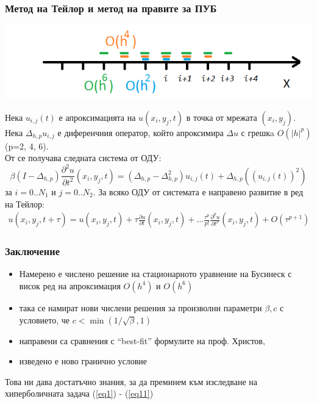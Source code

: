 \documentclass{beamer}
\newcommand{\rf}[1]{(\ref{#1})}
\begin{document}
\begin{frame}
\frametitle{Метод на Тейлор и метод на правите за ПУБ}
\begin{center}\vspace{0.25cm}
	\begin{minipage}[b]{0.45\linewidth}
		 \includegraphics[width=\linewidth]{../amitans/figures/FDS.png}
	\end{minipage}	
\end{center}
Нека $u_{i,j}(t)$ е апроксимацията на $u(x_i, y_j, t)$ в точка от мрежата $(x_i, y_j)$.
\\
Нека $\Delta_{h,p} u_{i,j}$ е диференчния оператор, който апроксимира $\Delta u$ с грешкa $O(|h|^p)$ (p=2, 4, 6).
\\
От  се получава следната система от ОДУ:
\begin{equation}\label{DiscreteEq}
\beta (I-\Delta_{h,p}) \frac{\partial^2 u}{\partial t^2}(x_i, y_j, t)=
 (\Delta_{h,p} - \Delta_{h,p}^2) u_{i, j}(t) + \Delta_{h,p} ( ( u_{i, j}(t) )^2 )
\end{equation}
за $i = 0..N_1$ и $j=0..N_2$. За всяко ОДУ от системата е направено развитие в ред на Тейлор:
\begin{align} \label{TSe}
u(x_i, y_j, t+\tau) = u(x_i, y_j, t) + \tau \frac{ \partial u }{ \partial t }(x_i, y_j, t)  + ... 
\frac{ \tau^p }{ p! } \frac{ \partial^p u }{ \partial t^p }(x_i, y_j, t) + O(\tau^{p+1})
\end{align}

\end{frame}

\begin{frame}
\frametitle{Заключение}

\begin{itemize}
  \item Намерено е числено решение на стационарното уравнение на Бусинеск с висок ред на апроксимация $O(h^4)$ и $O(h^6)$
  \item така се намират нови числени решения за произволни параметри $\beta, c$ с условието, че $c < \min (1/ \sqrt{\beta},1)$
  \item направени са сравнения с ``best-fit'' формулите на проф. Христов,
  \item изведено е ново гранично условие
\end{itemize}

Това ни дава достатъчно знания, за да преминем към изследване на хиперболичната задача \rf{eq1} - \rf{eq11}
\end{frame}
\end{document}
